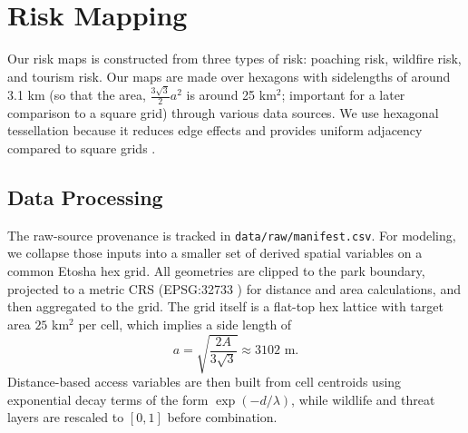 \section{Risk Mapping}
Our risk maps is constructed from three types of risk: poaching risk, wildfire risk, and tourism risk. Our maps are made over hexagons with sidelengths of around 3.1 km (so that the area, $\frac{3\sqrt{3}}{2}a^2$ is around 25 km$^2$; important for a later comparison to a square grid) through various data sources. We use hexagonal tessellation because it reduces edge effects and provides uniform adjacency compared to square grids \cite{birch2007hex}.

\subsection{Data Processing}

The raw-source provenance is tracked in \texttt{data/raw/manifest.csv}. For modeling, we collapse those inputs into a smaller set of derived spatial variables on a common Etosha hex grid. All geometries are clipped to the park boundary, projected to a metric CRS (EPSG:32733 \cite{epsg32733}) for distance and area calculations, and then aggregated to the grid. The grid itself is a flat-top hex lattice with target area $25$ km$^2$ per cell, which implies a side length of
\[
a = \sqrt{\frac{2A}{3\sqrt{3}}} \approx 3102 \text{ m}.
\]
Distance-based access variables are then built from cell centroids using exponential decay terms of the form $\exp(-d/\lambda)$, while wildlife and threat layers are rescaled to $[0,1]$ before combination.

